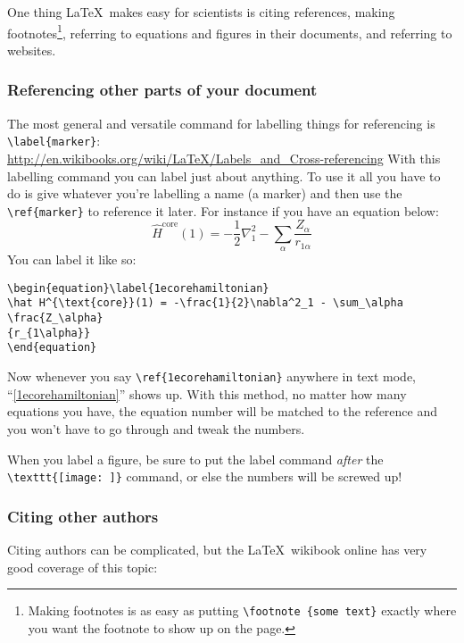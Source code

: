 One thing \LaTeX\ makes easy for scientists is citing references, making footnotes\footnote {Making footnotes is as easy as putting \texttt{\textbackslash footnote \{some text\}} exactly where you want the footnote to show up on the page.}, referring to equations and figures in their documents, and referring to websites. 

\subsubsection{Referencing other parts of your document}
The most general and versatile command for labelling things for referencing is \verb|\label{marker}|:\\ \url{http://en.wikibooks.org/wiki/LaTeX/Labels_and_Cross-referencing}
With this labelling command you can label just about anything. To use it all you have to do is give whatever you're labelling a name (a marker) and then use the \verb|\ref{marker}| to reference it later. For instance if you have an equation below:
\begin{equation}\label{1ecorehamiltonian}
\hat H^{\text{core}}(1) = -\frac{1}{2}\nabla^2_1 - \sum_\alpha \frac{Z_\alpha}{r_{1\alpha}} 
\end{equation}
You can label it like so:
\begin{framed}
\begin{verbatim}
\begin{equation}\label{1ecorehamiltonian}
\hat H^{\text{core}}(1) = -\frac{1}{2}\nabla^2_1 - \sum_\alpha \frac{Z_\alpha}
{r_{1\alpha}} 
\end{equation}
\end{verbatim}
\end{framed}
Now whenever you say \verb|\ref{1ecorehamiltonian}| anywhere in text mode, ``\ref{1ecorehamiltonian}'' shows up. With this method, no matter how many equations you have, the equation number will be matched to the reference and you won't have to go through and tweak the numbers.

\begin{remark}
When you label a figure, be sure to put the label command \emph{after} the \verb|\texttt{[image: ]}| command, or else the numbers will be screwed up!
\end{remark}
\subsubsection{Citing other authors}
Citing authors can be complicated, but the \LaTeX\ wikibook online has very good coverage of this topic:

